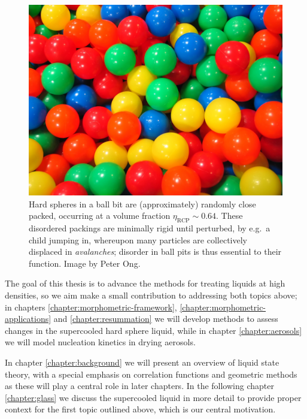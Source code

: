 \documentclass[11pt,twoside]{report}
\begin{document}
\begin{figure}
  \includegraphics[width=0.75\linewidth,outer]{ball-pit-horizontal}
  \caption[Random close packing in a ball pit]{
    Hard spheres in a ball bit are (approximately) randomly close packed, occurring at a volume fraction $\eta_\mathrm{RCP} \sim 0.64$.
    These disordered packings are minimally rigid until perturbed, by e.g.\ a child jumping in, whereupon many particles are collectively displaced in \emph{avalanches}; disorder in ball pits is thus essential to their function.
    Image by Peter Ong.}
  \label{fig:rcp}
\end{figure}

The goal of this thesis is to advance the methods for treating liquids at high densities, so we aim make a small contribution to addressing both topics above; in chapters \ref{chapter:morphometric-framework}, \ref{chapter:morphometric-applications} and \ref{chapter:resummation} we will develop methods to assess changes in the supercooled hard sphere liquid, while in chapter \ref{chapter:aerosols} we will model nucleation kinetics in drying aerosols.


In chapter \ref{chapter:background} we will present an overview of liquid state theory, with a special emphasis on correlation functions and geometric methods as these will play a central role in later chapters.
In the following chapter \ref{chapter:glass} we discuss the supercooled liquid in more detail to provide proper context for the first topic outlined above, which is our central motivation.
\end{document}
